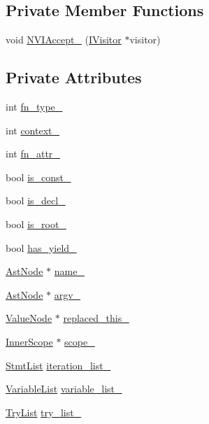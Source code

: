 \subsection*{Private Member Functions}
\begin{DoxyCompactItemize}
\item 
void \hyperlink{classmocha_1_1_function_ac8aea50fb291b078333d89530a25a627}{NVIAccept\_\-} (\hyperlink{classmocha_1_1_i_visitor}{IVisitor} $\ast$visitor)
\end{DoxyCompactItemize}
\subsection*{Private Attributes}
\begin{DoxyCompactItemize}
\item 
int \hyperlink{classmocha_1_1_function_ab96b5bc0337b378b937eb721568c02dc}{fn\_\-type\_\-}
\item 
int \hyperlink{classmocha_1_1_function_a91db13aafbd564b49413f780450fedb4}{context\_\-}
\item 
int \hyperlink{classmocha_1_1_function_ac2610c4e7f6eed41c2a213161d63a7e0}{fn\_\-attr\_\-}
\item 
bool \hyperlink{classmocha_1_1_function_af16f2b3ef9c2e2aeedd8bd2f498b3e68}{is\_\-const\_\-}
\item 
bool \hyperlink{classmocha_1_1_function_a921285276ef8d34a0be645fa2f30ff22}{is\_\-decl\_\-}
\item 
bool \hyperlink{classmocha_1_1_function_a9e6f90ffd90e9300d52fa848fa683bd7}{is\_\-root\_\-}
\item 
bool \hyperlink{classmocha_1_1_function_a854ca0fbe7fcf694b0fc9b9edbf1fd55}{has\_\-yield\_\-}
\item 
\hyperlink{classmocha_1_1_ast_node}{AstNode} $\ast$ \hyperlink{classmocha_1_1_function_ac2e4d75b6c293a0f2d6344df8cdc10e7}{name\_\-}
\item 
\hyperlink{classmocha_1_1_ast_node}{AstNode} $\ast$ \hyperlink{classmocha_1_1_function_a11310ef6f72f85539da7a1a2f500aa81}{argv\_\-}
\item 
\hyperlink{classmocha_1_1_value_node}{ValueNode} $\ast$ \hyperlink{classmocha_1_1_function_a06bcbfa74031bdac59acc8d0bbc46e2c}{replaced\_\-this\_\-}
\item 
\hyperlink{classmocha_1_1_inner_scope}{InnerScope} $\ast$ \hyperlink{classmocha_1_1_function_aa72c922f8808342eaad6b06d49a8757c}{scope\_\-}
\item 
\hyperlink{classmocha_1_1_function_a5c4a48ede908b355b4f13a8f1d585707}{StmtList} \hyperlink{classmocha_1_1_function_a4ac68f0b0e7ed2a47d6d340d1d75777b}{iteration\_\-list\_\-}
\item 
\hyperlink{classmocha_1_1_function_a243702678d29f0cfd91913838c1fb38c}{VariableList} \hyperlink{classmocha_1_1_function_af7dd9ddfa47f825f6ac37eca4648c4eb}{variable\_\-list\_\-}
\item 
\hyperlink{classmocha_1_1_function_a9991b3d8362e4a8889c4b50d930d88ce}{TryList} \hyperlink{classmocha_1_1_function_a3adc54c775dcb9470a3d2ecabcd679f0}{try\_\-list\_\-}
\end{DoxyCompactItemize}


